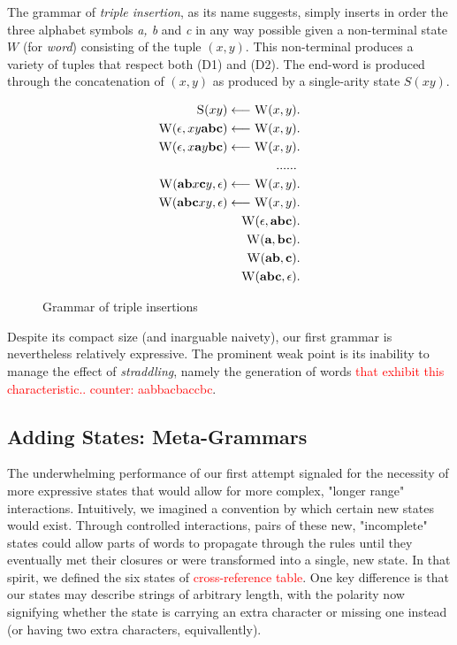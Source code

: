 \documentclass[nonatbib,numbers,10pt]{sigplanconf}
\newcommand\todo[1]{\textcolor{red}{#1}}
\newcommand\s{\textsc}
\begin{document}
The grammar of \textit{triple insertion}, as its name suggests, simply inserts in order the three alphabet symbols \textit{a, b} and \textit{c} in any way possible given a non-terminal state $W$ (for \textit{word}) consisting of the tuple $(x,y)$. This non-terminal produces a variety of tuples that respect both (D1) and (D2). The end-word is produced through the concatenation of $(x,y)$ as produced by a single-arity state $S(xy)$.
\begin{figure}[h!]
\begin{align}
\setcounter{equation}{0}
\s{S}(xy) \longleftarrow \s{W}(x,y)&. \\
\s{W}(\epsilon, xy\textbf{abc}) \longleftarrow \s{W}(x,y)&. \\
\s{W}(\epsilon, x\textbf{a}y\textbf{bc}) \longleftarrow \s{W}(x,y)&. \\
...... \nonumber \\
\setcounter{equation}{59}
\s{W}(\textbf{ab}x\textbf{c}y, \epsilon) \longleftarrow \s{W}(x,y)&. \\
\s{W}(\textbf{abc}xy, \epsilon) \longleftarrow \s{W}(x,y)&. \\
\s{W}(\epsilon, \textbf{abc})&. \\
\s{W}(\textbf{a}, \textbf{bc})&. \\
\s{W}(\textbf{ab}, \textbf{c})&. \\
\s{W}(\textbf{abc}, \epsilon)&.
\end{align}
\caption{Grammar of triple insertions}
\end{figure}

Despite its compact size (and inarguable naivety), our first grammar is nevertheless relatively expressive. The prominent weak point is its inability to manage the effect of \textit{straddling}, namely the generation of words \todo{that exhibit this characteristic.. counter: aabbacbaccbc}.
\subsection{Adding States: Meta-Grammars}
The underwhelming performance of our first attempt signaled for the necessity of more expressive states that would allow for more complex, "longer range" interactions. Intuitively, we imagined a convention by which certain new states would exist. Through controlled interactions, pairs of these new, "incomplete" states could allow parts of words to propagate through the rules until they eventually met their closures or were transformed into a single, new state. In that spirit, we defined the six states of \todo{cross-reference table}. One key difference is that our states may describe strings of arbitrary length, with the polarity now signifying whether the state is carrying an extra character or missing one instead (or having two extra characters, equivallently).
\end{document}
